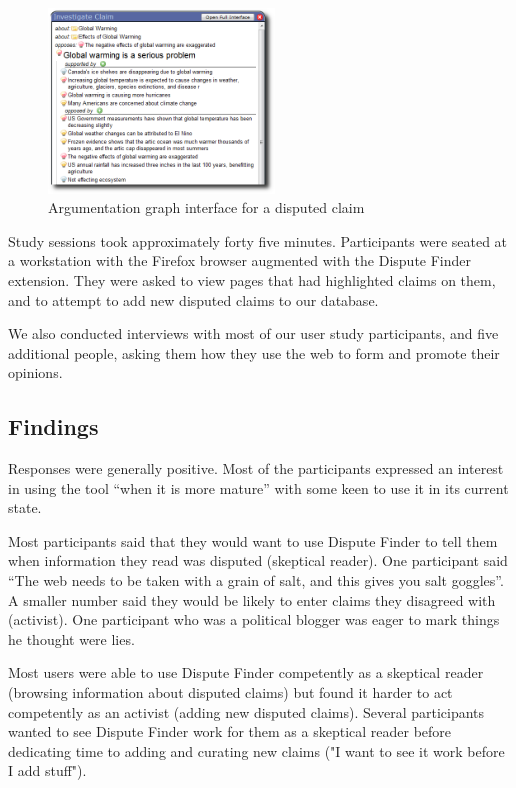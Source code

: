 \documentclass{www2010-submission}
\newcommand{\todo}[1]{}
\begin{document}
\begin{figure}[tb]
	\begin{center}
	\includegraphics[width=6cm]{pictures/popup_graph_crop.png}
	\caption{Argumentation graph interface for a disputed claim}
	\label{popup_graph}
	\end{center}
\end{figure}


Study sessions took approximately forty five minutes. Participants were seated at a workstation with the Firefox browser augmented with the Dispute Finder extension. They were asked to view pages that had highlighted claims on them, and to attempt to add new disputed claims to our database.

We also conducted interviews with most of our user study participants, and five additional people, asking them how they use the web to form and promote their opinions.

\todo{Need to finish the third wave of user studies}

\subsection{Findings}

Responses were generally positive. Most of the participants expressed an interest in using the tool ``when it is more mature'' with some keen to use it in its current state.

\todo{Tye: say how many were keen to use the tool.}

Most participants said that they would want to use Dispute Finder to tell them when information they read was disputed (skeptical reader). One participant said ``The web needs to be taken with a grain of salt, and this gives you salt goggles''. A smaller number said they would be likely to enter claims they disagreed with (activist). One participant who was a political blogger was eager to mark things he thought were lies.

Most users were able to use Dispute Finder competently as a skeptical reader (browsing information about disputed claims) but found it harder to act competently as an activist (adding new disputed claims). Several participants wanted to see Dispute Finder work for them as a skeptical reader before dedicating time to adding and curating new claims ("I want to see it work before I add stuff").
\end{document}
